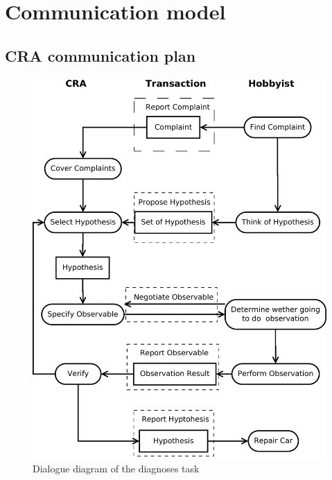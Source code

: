\documentclass[a4paper,10pt]{article}
\begin{document}
\section{Communication model}
\subsection{CRA communication plan}
\begin{figure}[htbp]
	\centering
		\includegraphics[width=1.00\textwidth]{dialogueDiagram.pdf}
	\caption{Dialogue diagram of the diagnoses task}
	\label{fig:dialogueDiagram}
\end{figure}
\end{document}
